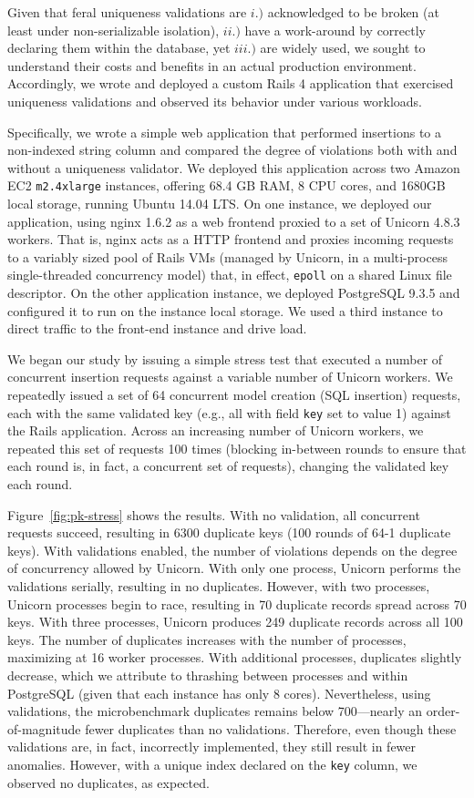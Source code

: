 Given that feral uniqueness validations are $i.)$ acknowledged to be
broken (at least under non-serializable isolation), $ii.)$ have a
work-around by correctly declaring them within the database, yet
$iii.)$ are widely used, we sought to understand their costs and
benefits in an actual production environment. Accordingly, we wrote
and deployed a custom Rails 4 application that exercised uniqueness
validations and observed its behavior under various workloads.

Specifically, we wrote a simple web application that performed
insertions to a non-indexed string column and compared the degree of
violations both with and without a uniqueness validator. We deployed
this application across two Amazon EC2 \texttt{m2.4xlarge} instances,
offering 68.4 GB RAM, 8 CPU cores, and 1680GB local storage, running
Ubuntu 14.04 LTS. On one instance, we deployed our application, using
nginx 1.6.2 as a web frontend proxied to a set of Unicorn 4.8.3
workers. That is, nginx acts as a HTTP frontend and proxies incoming
requests to a variably sized pool of Rails VMs (managed by Unicorn, in
a multi-process single-threaded concurrency model) that, in effect,
\texttt{epoll} on a shared Linux file descriptor. On the other
application instance, we deployed PostgreSQL 9.3.5 and configured it
to run on the instance local storage. We used a third instance to
direct traffic to the front-end instance and drive load.

We began our study by issuing a simple stress test that executed a
number of concurrent insertion requests against a variable number of
Unicorn workers. We repeatedly issued a set of 64 concurrent model
creation (SQL insertion) requests, each with the same validated key
(e.g., all with field \texttt{key} set to value 1) against the Rails
application. Across an increasing number of Unicorn workers, we
repeated this set of requests 100 times (blocking in-between rounds to
ensure that each round is, in fact, a concurrent set of requests),
changing the validated key each round.

Figure~\ref{fig:pk-stress} shows the results. With no validation, all
concurrent requests succeed, resulting in 6300 duplicate keys (100
rounds of 64-1 duplicate keys). With validations enabled, the number
of violations depends on the degree of concurrency allowed by
Unicorn. With only one process, Unicorn performs the validations
serially, resulting in no duplicates. However, with two processes,
Unicorn processes begin to race, resulting in 70 duplicate records
spread across 70 keys. With three processes, Unicorn produces 249
duplicate records across all 100 keys. The number of duplicates
increases with the number of processes, maximizing at 16 worker
processes. With additional processes, duplicates slightly decrease,
which we attribute to thrashing between processes and within
PostgreSQL (given that each instance has only 8 cores). Nevertheless,
using validations, the microbenchmark duplicates remains below
700---nearly an order-of-magnitude fewer duplicates than no
validations. Therefore, even though these validations are, in fact,
incorrectly implemented, they still result in fewer
anomalies. However, with a unique index declared on the \texttt{key}
column, we observed no duplicates, as expected.

